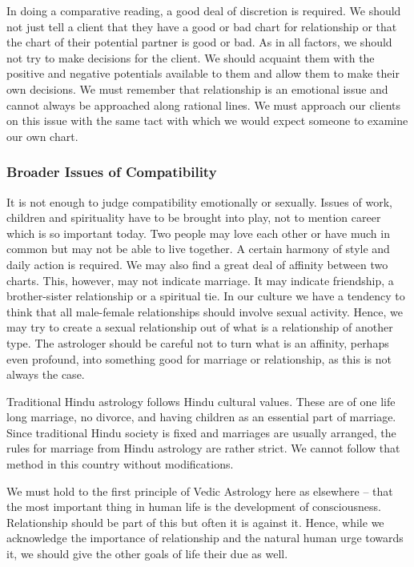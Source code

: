  

In doing a comparative reading, a good deal of discretion is required. We should not just tell a client that they have a good or bad chart for relationship or that the chart of their potential partner is good or bad. As in all factors, we should not try to make decisions for the client. We should acquaint them with the positive and negative potentials available to them and allow them to make their own decisions. We must remember that relationship is an emotional issue and cannot always be approached along rational lines. We must approach our clients on this issue with the same tact with which we would expect someone to examine our own chart.

 

\subsubsection{Broader Issues of Compatibility}

 

It is not enough to judge compatibility emotionally or sexually. Issues of work, children and spirituality have to be brought into play, not to mention career which is so important today. Two people may love each other or have much in common but may not be able to live together. A certain harmony of style and daily action is required. We may also find a great deal of affinity between two charts. This, however, may not indicate marriage.  It may indicate friendship, a brother-sister relationship or a spiritual tie. In our culture we have a tendency to think that all male-female relationships should involve sexual activity. Hence, we may try to create a sexual relationship out of what is a relationship of another type. The astrologer should be careful not to turn what is an affinity, perhaps even profound, into something good for marriage or relationship, as this is not always the case.

 

Traditional Hindu astrology follows Hindu cultural values. These are of one life long marriage, no divorce, and having children as an essential part of marriage. Since traditional Hindu society is fixed and marriages are usually arranged, the rules for marriage from Hindu astrology are rather strict. We cannot follow that method in this country without modifications.

 

We must hold to the first principle of Vedic Astrology here as elsewhere – that the most important thing in human life is the development of consciousness. Relationship should be part of this but often it is against it. Hence, while we acknowledge the importance of relationship and the natural human urge towards it, we should give the other goals of life their due as well.

